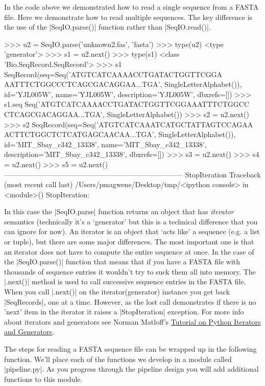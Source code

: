 In the code above we demonstrated how to read a single sequence from a FASTA file.  Here we demonstrate how to read multiple sequences.  The key difference is the use of the |SeqIO.parse()| function rather than |SeqIO.read()|.

\begin{python}
>>> u2 = SeqIO.parse('unknown2.fas', 'fasta')
>>> type(u2)
<type 'generator'>
>>> s1 = u2.next()
>>> type(s1)
<class 'Bio.SeqRecord.SeqRecord'>
>>> s1
SeqRecord(seq=Seq('ATGTCATCAAAACCTGATACTGGTTCGGA
AATTTCTGGCCCTCAGCGACAGGAA...TGA', SingleLetterAlphabet()), 
id='YJL005W', name='YJL005W', description='YJL005W', dbxrefs=[])
>>> s1.seq
Seq('ATGTCATCAAAACCTGATACTGGTTCGGAAATTTCTGGCC
CTCAGCGACAGGAA...TGA', SingleLetterAlphabet())
>>> s2 = u2.next()
>>> s2
SeqRecord(seq=Seq('ATGTCATCAAATCATGCTATTAGTCCAGAA
ACTTCTGGCTCTCATGAGCAACAA...TGA', SingleLetterAlphabet()), 
id='MIT_Sbay_c342_13338', name='MIT_Sbay_c342_13338', 
description='MIT_Sbay_c342_13338', dbxrefs=[])
>>> s3 = u2.next()
>>> s4 = u2.next()
>>> s5 = u2.next()
---------------------------------------------------------------------------
StopIteration                             Traceback (most recent call last)
/Users/pmagwene/Desktop/tmp/<ipython console> in <module>()
StopIteration: 
\end{python}

In this case the |SeqIO.parse| function returns an object that has \emph{iterator} semantics (technically it's a `generator' but this is a technical difference that you can ignore for now). An iterator is an object that `acts like' a sequence (e.g. a list or tuple), but there are some major differences. The most important one is that an iterator does not have to compute the entire sequence at once. In the case of the |SeqIO.parse()| function that means that if you have a FASTA file with thousands of sequence entries it wouldn't try to suck them all into memory. The |.next()| method is used to call successive sequence entries in the FASTA file. When you call |.next()| on the iterator(generator) instance you get back |SeqRecords|, one at a time. However, as the lost call demonstrates if there is no 'next' item in the iterator it raises a |StopIteration| exception. For more info about iterators and generators see Norman Matloff's  \href{https://github.com/pmagwene/Bio313/raw/master/lecture-13/PyIterGen.pdf}{Tutorial on Python Iterators and Generators}. 

The steps for reading a FASTA sequence file can be wrapped up in the following function. We'll place each of the functions we develop in a module called |pipeline.py|.  As you progress through the pipeline design you will add additional functions to this module.

